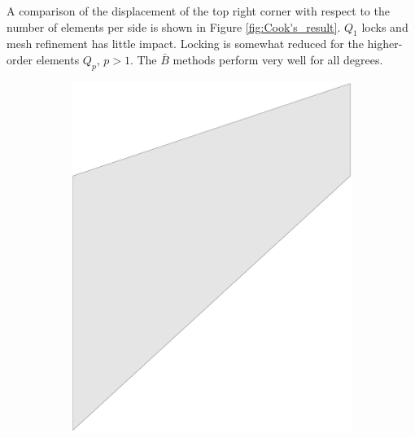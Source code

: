 \documentclass{article}
\begin{document}
A comparison of the displacement of the top right corner with respect to the number of elements per side is shown in Figure \ref{fig:Cook's_result}. $Q_1$ locks and mesh refinement has little impact. Locking is somewhat reduced for the higher-order elements $Q_p$, $p > 1$. The $\bar{B}$ methods perform very well for all degrees.
\begin{figure}[htb!]
    \centering
    \begin{subfigure}[b]{0.18\linewidth}        %
        \centering
        \includegraphics[width=\linewidth]{mesh_cook_0}
    \end{subfigure}
    \begin{subfigure}[b]{0.18\linewidth}        %
        \centering

\end{subfigure}
\end{figure}
\end{document}
